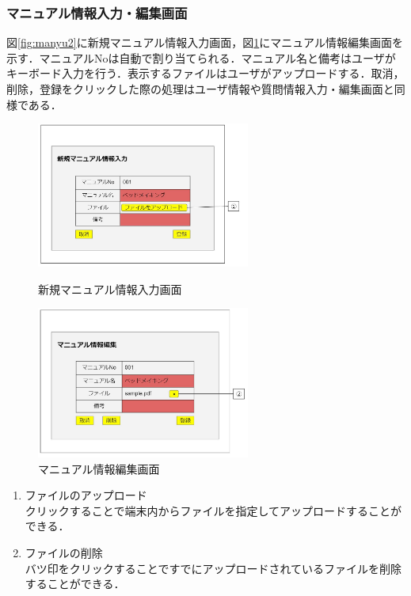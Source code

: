 \documentclass[main]{subfiles}
\begin{document}
\subsubsection{マニュアル情報入力・編集画面}
図\ref{fig:manyu2}に新規マニュアル情報入力画面，図\ref{fig:manyu3}にマニュアル情報編集画面を示す．マニュアルNoは自動で割り当てられる．マニュアル名と備考はユーザがキーボード入力を行う．表示するファイルはユーザがアップロードする．取消，削除，登録をクリックした際の処理はユーザ情報や質問情報入力・編集画面と同様である．

\begin{figure}[H]
    \begin{minipage}{0.5\hsize}
        \centering
        \includegraphics[width=7cm]{UI-umino/manyu2.JPG}
        \caption{新規マニュアル情報入力画面}
        \label{fig:manyu2}
    \end{minipage}
    \begin{minipage}{0.5\hsize}
        \centering
        \includegraphics[width=7cm]{UI-umino/manyu3.JPG}
        \caption{マニュアル情報編集画面}
        \label{fig:manyu3}
    \end{minipage} 
\end{figure}

\begin{enumerate}
\renewcommand{\labelenumi}{\textcircled{\scriptsize \theenumi}}
\item ファイルのアップロード\\ クリックすることで端末内からファイルを指定してアップロードすることができる．
\item ファイルの削除\\ バツ印をクリックすることですでにアップロードされているファイルを削除することができる．

\end{enumerate}
\end{document}
